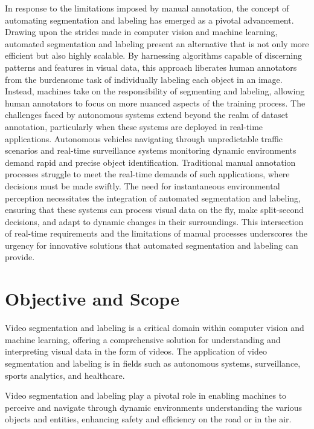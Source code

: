 \noindent
In response to the limitations imposed by manual annotation, the concept of automating segmentation and labeling has emerged as a pivotal advancement. Drawing upon the strides made in computer vision and machine learning, automated segmentation and labeling present an alternative that is not only more efficient but also highly scalable. By harnessing algorithms capable of discerning patterns and features in visual data, this approach liberates human annotators from the burdensome task of individually labeling each object in an image. Instead, machines take on the responsibility of segmenting and labeling, allowing human annotators to focus on more nuanced aspects of the training process. The challenges faced by autonomous systems extend beyond the realm of dataset annotation, particularly when these systems are deployed in real-time applications. Autonomous vehicles navigating through unpredictable traffic scenarios and real-time surveillance systems monitoring dynamic environments demand rapid and precise object identification. Traditional manual annotation processes struggle to meet the real-time demands of such applications, where decisions must be made swiftly. The need for instantaneous environmental perception necessitates the integration of automated segmentation and labeling, ensuring that these systems can process visual data on the fly, make split-second decisions, and adapt to dynamic changes in their surroundings. This intersection of real-time requirements and the limitations of manual processes underscores the urgency for innovative solutions that automated segmentation and labeling can provide.

\clearpage

\section{Objective and Scope}

Video segmentation and labeling is a critical domain within computer vision and machine learning, offering a comprehensive solution for understanding and interpreting visual data in the form of videos.  The application of video segmentation and labeling is in fields such as autonomous systems, surveillance, sports analytics, and healthcare.

\noindent
 Video segmentation and labeling play a pivotal role in enabling machines to perceive and navigate through dynamic environments understanding the various objects and entities, enhancing safety and efficiency on the road or in the air.

